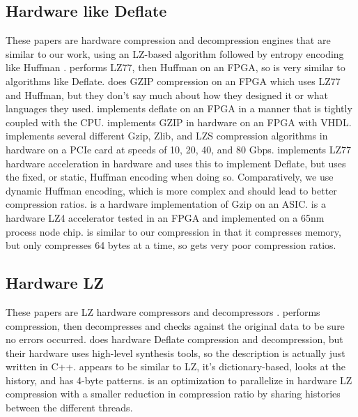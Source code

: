 \documentclass[doublespace,draft,nopageskip]{VTthesis} %
\begin{document}
\subsection{Hardware like Deflate}\label{ss:hardware_like_deflate}
These papers are hardware compression and decompression engines that are similar to our work, using an LZ-based algorithm followed by entropy encoding like Huffman \cite{microsoft, ibm}. \cite{xpress9} performs LZ77, then Huffman on an FPGA, so is very similar to algorithms like Deflate. \cite{fpgamulticoregzip} does GZIP compression on an FPGA which uses LZ77 and Huffman, but they don't say much about how they designed it or what languages they used. \cite{fpgadeflate} implements deflate on an FPGA in a manner that is tightly coupled with the CPU. \cite{fpgahuffmanlz77} implements GZIP in hardware on an FPGA with VHDL. \cite{aha} implements several different Gzip, Zlib, and LZS compression algorithms in hardware on a PCIe card at speeds of 10, 20, 40, and 80 Gbps. \cite{ribeiro} implements LZ77 hardware acceleration in hardware and uses this to implement Deflate, but uses the fixed, or static, Huffman encoding when doing so. Comparatively, we use dynamic Huffman encoding, which is more complex and should lead to better compression ratios. \cite{gziponachip} is a hardware implementation of Gzip on an ASIC. \cite{hardwarelz4} is a hardware LZ4 accelerator tested in an FPGA and implemented on a 65nm process node chip. \cite{compresso} is similar to our compression in that it compresses memory, but only compresses 64 bytes at a time, so gets very poor compression ratios.

\subsection{Hardware LZ}\label{ss:hardware_lz}
These papers are LZ hardware compressors and decompressors \cite{lz77fpga, lzfpga}.  \cite{lzfpga} performs compression, then decompresses and checks against the original data to be sure no errors occurred. \cite{highthroughputdeflate} does hardware Deflate compression and decompression, but their hardware uses high-level synthesis tools, so the description is actually just written in C++. \cite{xmatchpro} appears to be similar to LZ, it's dictionary-based, looks at the history, and has 4-byte patterns. \cite{ibmoptimization} is an optimization to parallelize in hardware LZ compression with a smaller reduction in compression ratio by sharing histories between the different threads.
\end{document}
